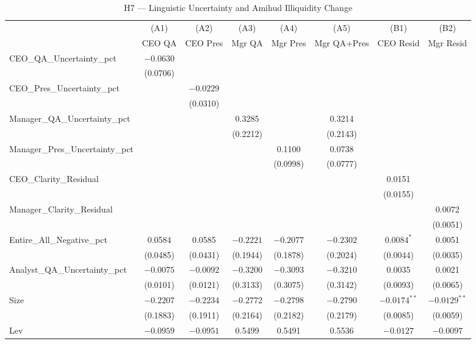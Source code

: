 \documentclass[12pt,a4paper]{article}
\begin{document}
\begin{table}[H]
\centering
\caption{H7 --- Linguistic Uncertainty and Amihud Illiquidity Change}
\label{tab:h7}
\begin{threeparttable}
\begin{scriptsize}
\renewcommand{\arraystretch}{0.85}
\begin{tabular}{lccccccc}
\toprule
& (A1) & (A2) & (A3) & (A4) & (A5) & (B1) & (B2) \\
& CEO QA & CEO Pres & Mgr QA & Mgr Pres & Mgr QA+Pres & CEO Resid & Mgr Resid \\
\midrule
CEO\_QA\_Uncertainty\_pct & $-0.0630$ & & & & & & \\
 & (0.0706) & & & & & & \\[1pt]
CEO\_Pres\_Uncertainty\_pct & & $-0.0229$ & & & & & \\
 & & (0.0310) & & & & & \\[1pt]
Manager\_QA\_Uncertainty\_pct & & & 0.3285 & & 0.3214 & & \\
 & & & (0.2212) & & (0.2143) & & \\[1pt]
Manager\_Pres\_Uncertainty\_pct & & & & 0.1100 & 0.0738 & & \\
 & & & & (0.0998) & (0.0777) & & \\[1pt]
CEO\_Clarity\_Residual & & & & & & 0.0151 & \\
 & & & & & & (0.0155) & \\[1pt]
Manager\_Clarity\_Residual & & & & & & & 0.0072 \\
 & & & & & & & (0.0051) \\[1pt]
Entire\_All\_Negative\_pct & 0.0584 & 0.0585 & $-0.2221$ & $-0.2077$ & $-0.2302$ & $\mathbf{0.0084}^{*}$ & 0.0051 \\
 & (0.0485) & (0.0431) & (0.1944) & (0.1878) & (0.2024) & (0.0044) & (0.0035) \\[1pt]
Analyst\_QA\_Uncertainty\_pct & $-0.0075$ & $-0.0092$ & $-0.3200$ & $-0.3093$ & $-0.3210$ & 0.0035 & 0.0021 \\
 & (0.0101) & (0.0121) & (0.3133) & (0.3075) & (0.3142) & (0.0093) & (0.0065) \\[1pt]
Size & $-0.2207$ & $-0.2234$ & $-0.2772$ & $-0.2798$ & $-0.2790$ & $\mathbf{-0.0174}^{**}$ & $\mathbf{-0.0129}^{**}$ \\
 & (0.1883) & (0.1911) & (0.2164) & (0.2182) & (0.2179) & (0.0085) & (0.0059) \\[1pt]
Lev & $-0.0959$ & $-0.0951$ & 0.5499 & 0.5491 & 0.5536 & $-0.0127$ & $-0.0097$ \\

\end{tabular}
\end{scriptsize}
\end{threeparttable}
\end{table}
\end{document}

